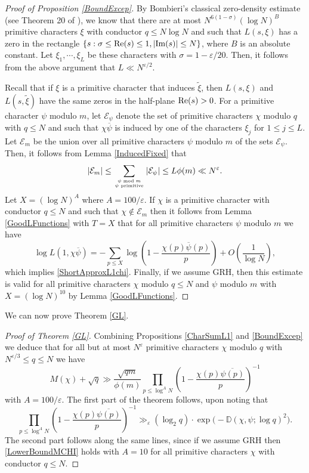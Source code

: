 \documentclass[12pt]{amsart}
\theoremstyle{definition}
\numberwithin{equation}{section}
\newcommand{\re}{\textup{Re}}
\newcommand{\im}{\textup{Im}}
\newcommand{\mb}{\mathbb}
\newcommand{\mc}{\mathcal}
\renewcommand{\bar}{\overline}
\begin{document}
\begin{proof}[Proof of Proposition \ref{BoundExcep}]
By Bombieri's classical zero-density estimate (see Theorem 20 of \cite{Bo}), we know that there are at most $N^{6(1-\sigma)}(\log N)^B$ primitive characters $\xi$ with conductor $q\leq N\log N$ and such that $L(s, \xi)$ has a zero in the rectangle $\{s: \sigma \leq \re(s) \leq 1, |\im(s)|\leq N\}$, where $B$ is an absolute constant. Let $\xi_1, \cdots, \xi_L$ be these characters with $\sigma=1-\varepsilon/20$. Then, it follows from the above argument that $L\ll N^{\varepsilon/2}$. 
 
Recall that if $\xi$ is a primitive character that induces $\tilde{\xi}$, then $L(s, \xi)$ and $L(s, \tilde{\xi})$ have the same zeros in the half-plane $\re(s)>0$.   For a primitive character $\psi$ modulo $m$, let $\mc{E}_{\psi}$ denote the set of primitive characters $\chi$ modulo $q$ with $q\leq N$ and such that $\chi \bar{\psi}$ is induced by one of the characters $\xi_j$ for $1\leq j\leq L$. Let $\mathcal{E}_m$ be the union over all primitive characters $\psi$ modulo $m$ of the sets $\mathcal{E}_{\psi}$. Then, it follows from Lemma \ref{InducedFixed} that
$$
\left|\mc{E}_m\right| \leq \sum_{\psi \bmod m \atop \psi \textup { primitive}} |\mc{E}_{\psi}| \leq L\phi(m) \ll N^{\varepsilon}.
$$
Let $X=(\log N)^{A}$ where $A=100/\varepsilon$.  If $\chi$ is a primitive character with conductor $q\leq N$ and such that $\chi\notin\mc{E}_m$ then it follows from Lemma \ref{GoodLFunctions} with $T=X$ that for all primitive characters $\psi$ modulo $m$ we have
$$
\log L(1,\chi\bar{\psi})= -\sum_{p\leq X} \log\left(1-\frac{\chi(p)\bar{\psi}(p)}{p}\right) + O\left(\frac{1}{\log N}\right),
$$
which implies \eqref{ShortApproxL1chi}.
Finally, if we assume GRH, then this estimate is valid for all primitive characters $\chi$ modulo $q\leq N$ and $\psi$ modulo $m$ with $X=(\log N)^{10}$ by Lemma \ref{GoodLFunctions}.
\end{proof}
We can now prove Theorem \ref{GL}.
\begin{proof}[Proof of Theorem \ref{GL}]
Combining Propositions \ref{CharSumL1} and \ref{BoundExcep} we deduce that for all but at most $N^{\varepsilon}$ primitive characters $\chi$ modulo $q$ with $N^{\varepsilon/3} \leq q \leq N$ we have
\begin{equation}\label{LowerBoundMCHI}
M(\chi) + \sqrt{q}  \gg \frac{\sqrt{qm}}{\phi(m)} \prod_{p \leq \log^A N} \left(1-\frac{\chi(p)\bar{\psi(p)}}{p}\right)^{-1} 
\end{equation}
with $A=100/\varepsilon$. The first part of the theorem follows, upon noting that
$$ \prod_{p \leq \log^A N} \left(1-\frac{\chi(p)\bar{\psi(p)}}{p}\right)^{-1}  \gg_{\varepsilon} (\log_2 q) \cdot \exp\big(-\mb{D}(\chi,\psi;\log q)^2\big).
$$
The second part follows along the same lines, since if we assume GRH then \eqref{LowerBoundMCHI} holds with $A=10$ for all primitive characters $\chi$ with conductor $q\leq N$.
\end{proof}
\end{document}
